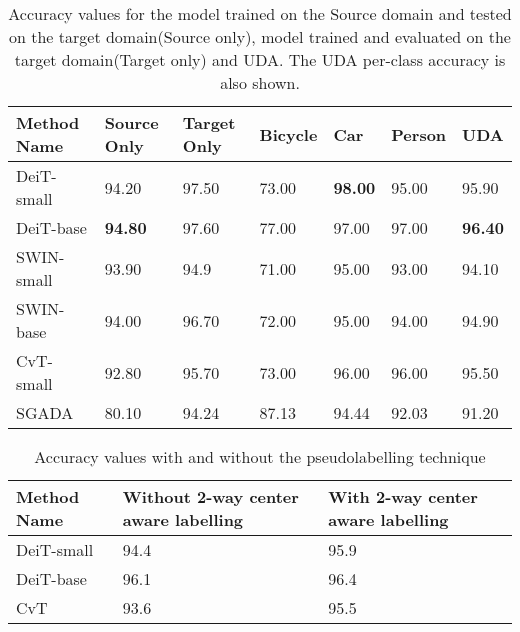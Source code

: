 \documentclass{article}
\begin{document}
\begin{table}[!h]
    \caption{Accuracy values for the model trained on the Source domain and tested on the target domain(Source only), model trained and evaluated on the target domain(Target only) and UDA. The UDA per-class accuracy is also shown.}
    \centering
   \begin{tabular}{ p{2cm}|p{2cm}|p{2cm}|p{1cm}|p{1cm}|p{1cm}|p{1cm}}
     \hline
     Method Name & Source Only & Target Only & Bicycle & Car & Person & UDA\\
     \hline
     DeiT-small & 94.20 & 97.50 & 73.00 & \textbf{98.00} & 95.00 & 95.90\\
     DeiT-base & \textbf{94.80} & 97.60 & 77.00 & 97.00 & 97.00 & \textbf{96.40}\\
     SWIN-small & 93.90 & 94.9 & 71.00 & 95.00 & 93.00 & 94.10\\
     SWIN-base & 94.00 & 96.70 & 72.00 & 95.00 & 94.00& 94.90\\
     CvT-small & 92.80 & 95.70 & 73.00 & 96.00 & 96.00 & 95.50\\
     SGADA \cite{sgada2021}  & 80.10 & 94.24 & 87.13 & 94.44 & 92.03 & 91.20\\
     \hline
    \end{tabular}

    \label{tab:my_label}
\end{table}

\begin{table}[!h]
    \centering
   \begin{tabular}{ p{7cm}|p{3cm}|p{3cm}}
     \hline
     Method Name & Without 2-way center aware labelling & With 2-way center aware labelling\\
     \hline
     DeiT-small & 94.4 & 95.9 \\
     DeiT-base & 96.1 & 96.4\\
     CvT & 93.6 & 95.5\\
     
     \hline
    \end{tabular}
    \vspace{2mm}
    \caption{Accuracy values with and without the pseudolabelling technique}
    \label{tab:my_label}
\end{table}
\end{document}
